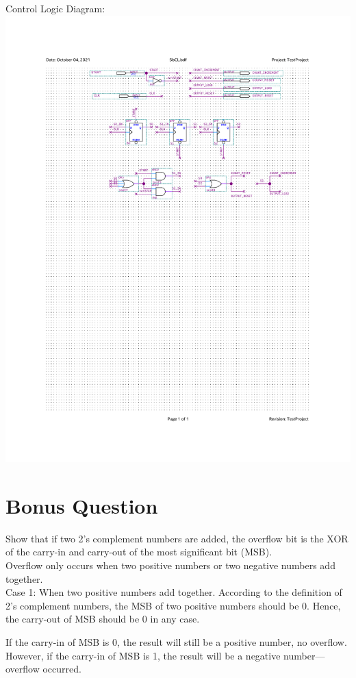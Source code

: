 \documentclass[12pt, a4paper]{article}
\begin{document}
	Control Logic Diagram:\\
	\includegraphics{5bControlLogic.pdf}

	\section*{Bonus Question}
	Show that if two 2's complement numbers are added, the overflow bit is the XOR of the carry-in and carry-out of the most significant bit (MSB).
	\\

	Overflow only occurs when two positive numbers or two negative numbers add together.
	\\

	Case 1: When two positive numbers add together. According to the definition of 2's complement numbers, the MSB of two positive numbers should be 0. Hence, the carry-out of MSB should be 0 in any case.

	If the carry-in of MSB is 0, the result will still be a positive number, no overflow. However, if the carry-in of MSB is 1, the result will be a negative number---overflow occurred. 
	\\
\end{document}
